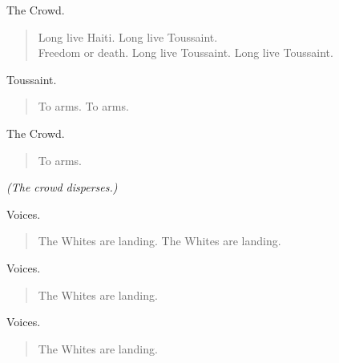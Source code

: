 \documentclass[letterpaper,article,12pt,oneside,notitlepage]{memoir}
\begin{document}
\begin{center}The Crowd.\end{center}

\begin{verse}
\hspace{1cm} Long live Haiti. Long live Toussaint. \\
Freedom or death. Long live Toussaint. Long live Toussaint. \\
\end{verse}

\begin{center}Toussaint.\end{center}

\begin{verse}
\hspace{1cm} To arms. To arms. \\
\end{verse}

\begin{center}The Crowd.\end{center}

\begin{verse}
\hspace{1cm} To arms.  \\
\end{verse}

\textit{(The crowd disperses.)}

\begin{center}Voices.\end{center}

\begin{verse}
\hspace{1cm} The Whites are landing. The Whites are landing. \\
\end{verse}

\begin{center}Voices.\end{center}

\begin{verse}
\hspace{1cm} The Whites are landing. \\
\end{verse}

\begin{center}Voices.\end{center}

\begin{verse}
\hspace{1cm} The Whites are landing. \\
\end{verse}
\end{document}
